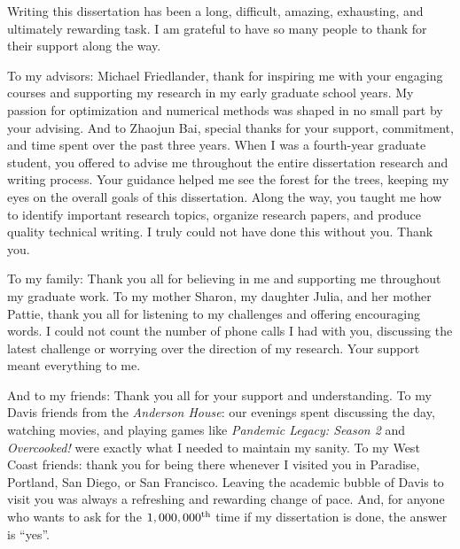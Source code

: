 Writing this dissertation has been a long, difficult, amazing, exhausting, and ultimately rewarding task.  I am grateful to have so many people to thank for their support along the way.

To my advisors: Michael Friedlander, thank for inspiring me with your engaging courses and supporting my research in my early graduate school years.  My passion for optimization and numerical methods was shaped in no small part by your advising.  
And to Zhaojun Bai, special thanks for your support, commitment, and time spent over the past three years.  When I was a fourth-year graduate student, you offered to advise me throughout the entire dissertation research and writing process. 
Your guidance helped me see the forest for the trees, keeping my eyes on the overall goals of this dissertation.  Along the way, you taught me how to identify important research topics, organize research papers, and produce quality technical writing.  I truly could not have done this without you.  Thank you.

To my family: Thank you all for believing in me and supporting me throughout my graduate work.  To my mother Sharon, my daughter Julia, and her mother Pattie, thank you all for listening to my challenges and offering encouraging words.  I could not count the number of phone calls I had with you, discussing the latest challenge or worrying over the direction of my research.  Your support meant everything to me.

And to my friends: Thank you all for your support and understanding.  To my Davis friends from the \textit{Anderson House}: our evenings spent discussing the day, watching movies, and playing games like \textit{Pandemic Legacy: Season 2} and \textit{Overcooked!} were exactly what I needed to maintain my sanity.
To my West Coast friends: thank you for being there whenever I visited you in Paradise, Portland, San Diego, or San Francisco.
Leaving the academic bubble of Davis to visit you was always a refreshing and rewarding change of pace.
And, for anyone who wants to ask for the $1,000,000\textsuperscript{th}$ time if my dissertation is done, the answer is ``yes''.


